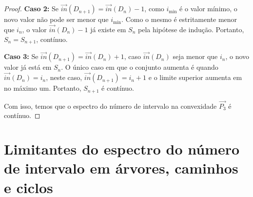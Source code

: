 \begin{proof}
  \noindent \textbf{Caso 2:} Se $\overrightarrow{in}(D_{n+1}) = \overrightarrow{in}(D_n)-1$, como $i_{\min}$ é o valor mínimo, o novo valor não pode ser menor que $i_{\min}$. Como o mesmo é estritamente menor que $i_{n}$, o valor $\overrightarrow{in}(D_n)-1$ já existe em $S_n$ pela hipótese de indução. Portanto, $S_n = S_{n+1}$, contínuo.

  \noindent \textbf{Caso 3:} Se $\overrightarrow{in}(D_{n+1}) = \overrightarrow{in}(D_n)+1$, caso $\overrightarrow{in}(D_n)$ seja menor que $i_{n}$, o novo valor já está em $S_n$. O único caso em que o conjunto aumenta é quando $\overrightarrow{in}(D_n) = i_n$, neste caso, $\overrightarrow{in}(D_{n+1}) = i_n + 1$ e o limite superior aumenta em no máximo um. Portanto, $S_{n+1}$ é contínuo.

  Com isso, temos que o espectro do número de intervalo na convexidade $\overrightarrow{P_3}$ é contínuo.

\end{proof}




\section{Limitantes do espectro do número de intervalo em árvores, caminhos e ciclos}


